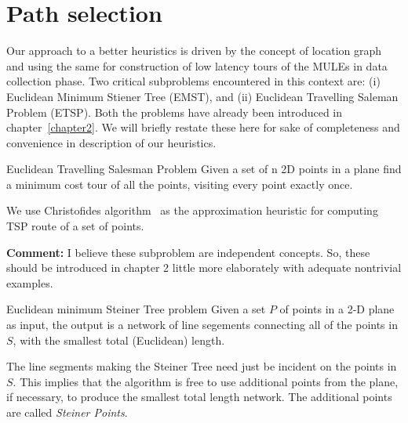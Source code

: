 \chapter{Path selection} \label{chap:steiner}


Our approach to a better heuristics
is driven by the concept of location graph and using the same for
construction of low latency tours of the MULEs in data collection phase. 
Two critical subproblems encountered in this context are: 
(i) Euclidean Minimum Stiener Tree (EMST), and (ii)  Euclidean Travelling Saleman Problem (ETSP). Both the problems have already been introduced
in chapter~\ref{chapter2}. We will briefly restate these here for
sake of completeness and convenience in description of our heuristics.

\begin{definition}{Euclidean Travelling Salesman Problem}
Given a set of n 2D points in a plane find a minimum cost tour of all
the points, visiting every point exactly once.
\end{definition}
We use Christofides algorithm~\cite{christofides} as the approximation 
heuristic for computing TSP route of a set of points.

{\bf Comment:} I believe these subproblem are independent concepts. 
So, these should be introduced in chapter 2 little more elaborately
with adequate nontrivial examples.


\begin{definition}{Euclidean minimum Steiner Tree problem}
Given a set $P$ of points in a 2-D plane as input, the output is a network of line segements connecting all of the points in $S$, with the smallest total (Euclidean) length.
\end{definition}
The line segments making the Steiner Tree need just be incident on the 
points in $S$. This implies that the algorithm is free to use additional 
points from the plane, if necessary, to produce the smallest total length 
network. The additional points are called {\em Steiner Points}.


